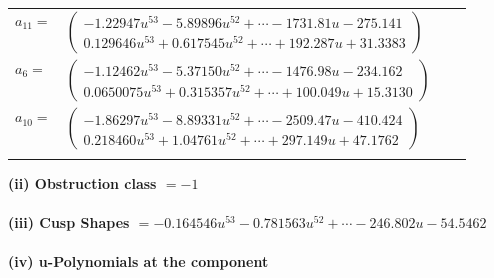 \documentclass[1p]{elsarticle_modified}
\theoremstyle{definition}
\begin{document}
\begin{tabular}{m{7pt} m{180pt} m{7pt} m{180pt} }
\flushright $a_{11}=$&$\begin{pmatrix}-1.22947 u^{53}-5.89896 u^{52}+\cdots-1731.81 u-275.141\\0.129646 u^{53}+0.617545 u^{52}+\cdots+192.287 u+31.3383\end{pmatrix}$ \\
\flushright $a_{6}=$&$\begin{pmatrix}-1.12462 u^{53}-5.37150 u^{52}+\cdots-1476.98 u-234.162\\0.0650075 u^{53}+0.315357 u^{52}+\cdots+100.049 u+15.3130\end{pmatrix}$ \\
\flushright $a_{10}=$&$\begin{pmatrix}-1.86297 u^{53}-8.89331 u^{52}+\cdots-2509.47 u-410.424\\0.218460 u^{53}+1.04761 u^{52}+\cdots+297.149 u+47.1762\end{pmatrix}$\\&\end{tabular}
\flushleft \textbf{(ii) Obstruction class $= -1$}\\~\\
\flushleft \textbf{(iii) Cusp Shapes $= -0.164546 u^{53}-0.781563 u^{52}+\cdots-246.802 u-54.5462$}\\~\\
\newpage\renewcommand{\arraystretch}{1}
\flushleft \textbf{(iv) u-Polynomials at the component}\newline \\
\end{document}
